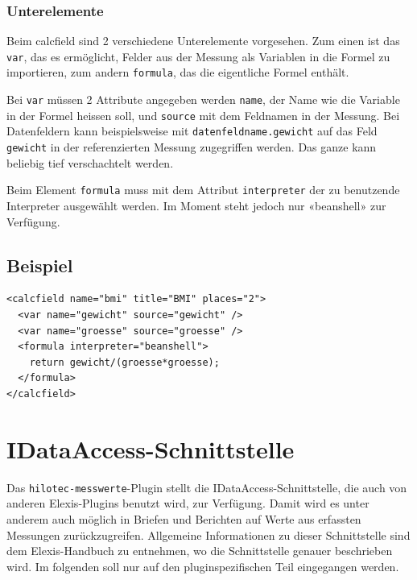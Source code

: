 \documentclass[a4paper]{scrartcl}
\begin{document}
\subsubsection{Unterelemente}
Beim calcfield sind 2 verschiedene Unterelemente vorgesehen. Zum einen ist das
\texttt{var}, das es ermöglicht, Felder aus der Messung als Variablen in die
Formel zu importieren, zum andern \texttt{formula}, das die eigentliche Formel
enthält.

Bei \texttt{var} müssen 2 Attribute angegeben werden \texttt{name}, der
Name wie die Variable in der Formel heissen soll, und \texttt{source} mit dem
Feldnamen in der Messung. Bei Datenfeldern kann beispielsweise mit
\texttt{datenfeldname.gewicht} auf das Feld \texttt{gewicht} in der
re\-fe\-ren\-zier\-ten Messung zugegriffen werden. Das ganze kann beliebig tief
verschachtelt werden.

Beim Element \texttt{formula} muss mit dem Attribut \texttt{interpreter} der zu
benutzende Interpreter ausgewählt werden. Im Moment steht jedoch nur «beanshell»
zur Verfügung.
\subsection{Beispiel}
\begin{lstlisting}
<calcfield name="bmi" title="BMI" places="2">
  <var name="gewicht" source="gewicht" />
  <var name="groesse" source="groesse" />
  <formula interpreter="beanshell">
    return gewicht/(groesse*groesse);
  </formula>
</calcfield>
\end{lstlisting}


\section{IDataAccess-Schnittstelle}
Das \texttt{hilotec-messwerte}-Plugin stellt die IDataAccess-Schnittstelle, die
auch von an\-de\-ren Elexis-Plugins benutzt wird, zur Verfügung. Damit wird es unter
anderem auch möglich in Briefen und Berichten auf Werte aus erfassten Messungen
zurückzugreifen. Allgemeine Informationen zu dieser Schnittstelle sind dem
Elexis-Handbuch zu ent\-neh\-men, wo die Schnittstelle genauer beschrieben wird. Im
folgenden soll nur auf den plug\-in\-spe\-zi\-fi\-schen Teil eingegangen werden.
\end{document}
